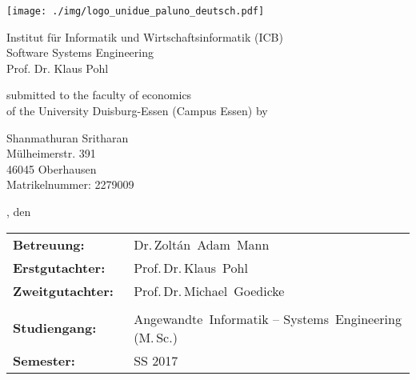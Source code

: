 \pagestyle{empty} %

\texttt{[image: ./img/logo\_unidue\_paluno\_deutsch.pdf]}

\begin{sffamily}

\begin{center}

\vspace*{0.7cm}

\normalsize{Institut für Informatik und Wirtschaftsinformatik (ICB)\\%
Software Systems Engineering\\
Prof. Dr. Klaus Pohl}


\vspace*{2.5cm}

\LARGE{\documentHeading}

\vspace*{1cm}

\large{\documentType}

\vspace*{2.5cm}

\normalsize{submitted to the faculty of economics\\
of the University Duisburg-Essen (Campus Essen) by}

\vspace*{\baselineskip}

\normalsize{
Shanmathuran Sritharan \\
Mülheimerstr. 391 \\
46045 Oberhausen \\
Matrikelnummer: 2279009
}

\vspace*{1.5cm}

\small{\documentLocation, den \documentDate}

\vspace*{1.5cm}

\normalsize{
\begin{tabular*}{\linewidth}{p{0.3\linewidth}p{0.7\linewidth}}
\textbf{Betreuung:}      & Dr.\,Zoltán~Adam~Mann\\
\textbf{Erstgutachter:}  & Prof.\,Dr.\,Klaus~Pohl\\
\textbf{Zweitgutachter:} & Prof.\,Dr.\,Michael~Goedicke\\
\\
\textbf{Studiengang:}    & Angewandte~Informatik -- Systems~Engineering (M.\,Sc.)\\
\textbf{Semester:}       & SS 2017
\end{tabular*}
}

\end{center}

\end{sffamily}
\clearpage